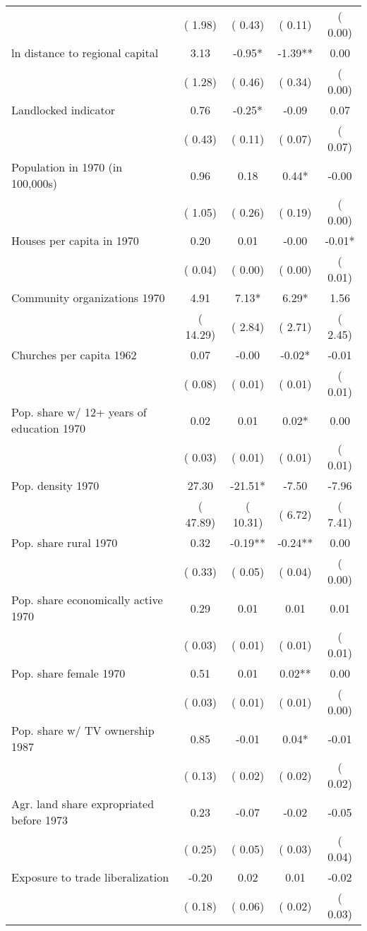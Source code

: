 \begin{tabular}{l c c c c }
\begin{tabular}{c}
    & (     1.98) & (     0.43) & (     0.11) & (     0.00) \\
ln distance to regional capital &      3.13 &     -0.95* &     -1.39** &      0.00  \\
    & (     1.28) & (     0.46) & (     0.34) & (     0.00) \\
Landlocked indicator &      0.76 &     -0.25* &     -0.09 &      0.07  \\
    & (     0.43) & (     0.11) & (     0.07) & (     0.07) \\
Population in 1970 (in 100,000s) &      0.96 &      0.18 &      0.44* &     -0.00  \\
    & (     1.05) & (     0.26) & (     0.19) & (     0.00) \\
Houses per capita in 1970 &      0.20 &      0.01 &     -0.00 &     -0.01*  \\
    & (     0.04) & (     0.00) & (     0.00) & (     0.01) \\
Community organizations 1970 &      4.91 &      7.13* &      6.29* &      1.56  \\
    & (    14.29) & (     2.84) & (     2.71) & (     2.45) \\
Churches per capita 1962 &      0.07 &     -0.00 &     -0.02* &     -0.01  \\
    & (     0.08) & (     0.01) & (     0.01) & (     0.01) \\
Pop. share w/ 12+ years of education 1970 &      0.02 &      0.01 &      0.02* &      0.00  \\
    & (     0.03) & (     0.01) & (     0.01) & (     0.01) \\
Pop. density 1970 &     27.30 &    -21.51* &     -7.50 &     -7.96  \\
    & (    47.89) & (    10.31) & (     6.72) & (     7.41) \\
Pop. share rural 1970 &      0.32 &     -0.19** &     -0.24** &      0.00  \\
    & (     0.33) & (     0.05) & (     0.04) & (     0.00) \\
Pop. share economically active 1970 &      0.29 &      0.01 &      0.01 &      0.01  \\
    & (     0.03) & (     0.01) & (     0.01) & (     0.01) \\
Pop. share female 1970 &      0.51 &      0.01 &      0.02** &      0.00  \\
    & (     0.03) & (     0.01) & (     0.01) & (     0.00) \\
Pop. share w/ TV ownership 1987 &      0.85 &     -0.01 &      0.04* &     -0.01  \\
    & (     0.13) & (     0.02) & (     0.02) & (     0.02) \\
Agr. land share expropriated before 1973 &      0.23 &     -0.07 &     -0.02 &     -0.05  \\
    & (     0.25) & (     0.05) & (     0.03) & (     0.04) \\
Exposure to trade liberalization &     -0.20 &      0.02 &      0.01 &     -0.02  \\
    & (     0.18) & (     0.06) & (     0.02) & (     0.03) \\
\toprule\toprule
\end{tabular} 
